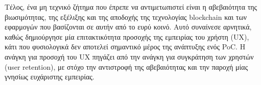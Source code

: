 Τέλος, ένα μη τεχνικό ζήτημα που έπρεπε να αντιμετωπιστεί είναι η αβεβαιότητα της βιωσιμότητας, της εξέλιξης και της αποδοχής της τεχνολογίας blockchain και των εφαρμογών που βασίζονται σε αυτήν από το ευρύ κοινό. Αυτό συναίνεσε αρνητικά, καθώς δημιούργησε μία επιτακτικότητα προσοχής της εμπειρίας του χρήστη (UX), κάτι που φυσιολογικά δεν αποτελεί σημαντικό μέρος της ανάπτυξης ενός PoC. Η ανάγκη για προσοχή του UX πηγάζει από την ανάγκη για συγκράτηση των χρηστών (user retention), με στόχο την αντιστροφή της αβεβαιότητας και την παροχή μίας γνησίως ευχάριστης εμπειρίας.
